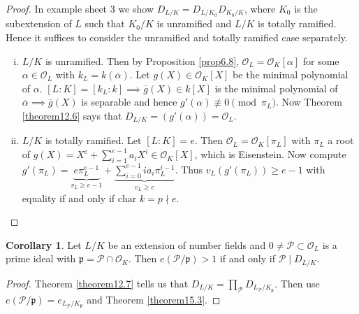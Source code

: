 \documentclass{article}
\theoremstyle{definition}
\newtheorem{cor}[theorem]{Corollary}
\begin{document}
\begin{proof}
    In example sheet 3 we show $D_{L/K} = D_{L/K_0} D_{K_0/K}$, where $K_0$ is the subextension of $L$ such that $K_0/K$ is unramified and $L/K$ is totally ramified. Hence it suffices to consider the unramified and totally ramified case separately.
    \begin{enumerate}[(i)]
        \item $L/K$ is unramified. Then by Proposition \ref{prop6.8}, $\mathcal{O}_L = \mathcal{O}_K[\alpha]$ for some $\alpha \in \mathcal{O}_L$ with $k_L = k(\overline{\alpha})$. Let $g(X) \in \mathcal{O}_K[X]$ be the minimal polynomial of $\alpha$. $[L:K] = [k_L:k] \implies \overline{g}(X) \in k[X]$ is the minimal polynomial of $\overline{\alpha} \implies \overline{g}(X)$ is separable and hence $g'(\alpha) \not\equiv 0 \pmod{\pi_L}$. Now Theorem \ref{theorem12.6} says that $D_{L/K} = (g'(\alpha)) = \mathcal{O}_L$.
        \item $L/K$ is totally ramified. Let $[L:K] = e$. Then $\mathcal{O}_L = \mathcal{O}_K[\pi_L]$ with $\pi_L$ a root of $g(X) = X^e +\sum_{i=1}^{e-1} a_i X^i \in \mathcal{O}_K[X]$, which is Eisenstein. Now compute $g'(\pi_L) = \underbrace{e \pi_L^{e-1}}_{v_L\ge e-1} + \underbrace{\sum_{i=0}^{e-1} i a_i \pi_L^{i-1}}_{v_L\ge e}$. Thus $v_L(g'(\pi_L))\ge e-1$ with equality if and only if $\text{char }k = p \nmid e$.
    \end{enumerate}
\end{proof}
\begin{cor}
    Let $L/K$ be an extension of number fields and $0 \neq \mathcal{P} \subset \mathcal{O}_L$ is a prime ideal with $\mathfrak{p} = \mathcal{P} \cap \mathcal{O}_K$. Then $e(\mathcal{P}/\mathfrak{p})>1$ if and only if $\mathcal{P} \mid  D_{L/K}$.
\end{cor}
\begin{proof}
    Theorem \ref{theorem12.7} tells us that $D_{L/K} = \prod_{\mathcal{P}}^{} D_{L_\mathcal{P}/K_\mathfrak{p}}$. Then use $e(\mathcal{P}/\mathfrak{p}) = e_{L_\mathcal{P}/K_\mathfrak{p}}$ and Theorem \ref{theorem15.3}.
\end{proof}
\end{document}

